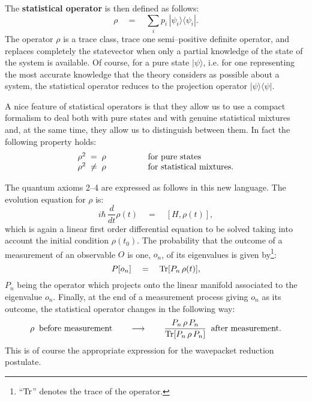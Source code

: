 \documentclass[12pt]{article}
\begin{document}
The {\bf statistical operator} is then defined as follows:
\begin{equation}
\rho \quad = \quad \sum_{i} p_{i}\, |\psi_{i}\rangle
\langle\psi_{i}|.
\end{equation}
The operator $\rho$ is a trace class, trace one semi--positive
definite operator, and replaces completely the statevector when
only a partial knowledge of the state of the system is available.
Of course, for a pure state $|\psi\rangle$, i.e. for one
representing the most accurate knowledge that the theory considers
as possible about a system, the statistical operator reduces to
the projection operator $|\psi\rangle\langle\psi|$.

A nice feature of statistical operators is that they allow us to
use a compact formalism to deal both with pure states and with
genuine statistical mixtures and, at the same time, they allow us
to distinguish between them. In fact the following property holds:
\[
\begin{array}{ll}
\rho^{2} \; = \; \rho \qquad & \qquad \makebox{for pure states} \\
\rho^{2} \; \neq \; \rho \qquad & \qquad \makebox{for statistical
mixtures.}
\end{array}
\]

The quantum axioms 2--4 are expressed  as follows in this new
language. The evolution equation for $\rho$ is:
\begin{equation}
i\hbar\,\frac{d}{dt} \rho(t) \quad = \quad \left[ H, \rho(t)
\right],
\end{equation}
which is again a linear first order differential equation to be
solved taking into account the initial condition $\rho(t_{0})$.
The probability that the outcome of a measurement of an observable
$O$ is one, $o_{n}$, of its eigenvalues is given
by\footnote{``$\makebox{Tr}$'' denotes the trace of the
operator.}:
\begin{equation}
P[o_{n}] \quad = \quad \makebox{Tr}[P_{n}\,\rho(t)],
\end{equation}
$P_{n}$ being the operator which projects onto the linear manifold
associated to the eigenvalue $o_{n}$. Finally, at the end of a
measurement process giving $o_{n}$ as its outcome, the statistical
operator changes in the following way:
\[
\rho \;\;\makebox{before measurement} \qquad \longrightarrow
\qquad \frac{P_{n}\,\rho\,P_{n}}{\makebox{Tr}[P_{n}\,\rho\,P_{n}]}
\;\;\makebox{after measurement}.
\]
This is of course the appropriate expression for the wavepacket
reduction postulate.
\end{document}
